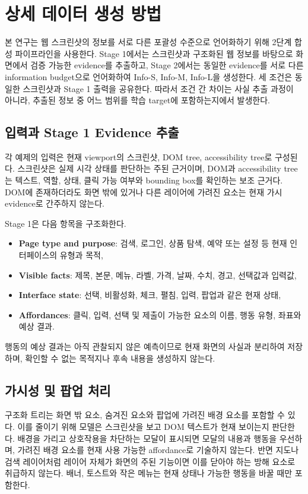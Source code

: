 \section{상세 데이터 생성 방법}
\label{app:data_generation}

본 연구는 웹 스크린샷의 정보를 서로 다른 포괄성 수준으로 언어화하기
위해 2단계 합성 파이프라인을 사용한다. Stage 1에서는 스크린샷과
구조화된 웹 정보를 바탕으로 화면에서 검증 가능한 evidence를 추출하고,
Stage 2에서는 동일한 evidence를 서로 다른 information budget으로
언어화하여 Info-S, Info-M, Info-L을 생성한다. 세 조건은 동일한
스크린샷과 Stage 1 출력을 공유한다. 따라서 조건 간 차이는 사실 추출
과정이 아니라, 추출된 정보 중 어느 범위를 학습 target에 포함하는지에서
발생한다.

\subsection{입력과 Stage 1 Evidence 추출}

각 예제의 입력은 현재 viewport의 스크린샷, DOM tree, accessibility
tree로 구성된다. 스크린샷은 실제 시각 상태를 판단하는 주된 근거이며,
DOM과 accessibility tree는 텍스트, 역할, 상태, 클릭 가능 여부와
bounding box를 확인하는 보조 근거다. DOM에 존재하더라도 화면 밖에
있거나 다른 레이어에 가려진 요소는 현재 가시 evidence로 간주하지
않는다.

Stage 1은 다음 항목을 구조화한다.
\begin{itemize}
    \item \textbf{Page type and purpose}: 검색, 로그인, 상품 탐색,
          예약 또는 설정 등 현재 인터페이스의 유형과 목적,
    \item \textbf{Visible facts}: 제목, 본문, 메뉴, 라벨, 가격, 날짜,
          수치, 경고, 선택값과 입력값,
    \item \textbf{Interface state}: 선택, 비활성화, 체크, 펼침, 입력,
          팝업과 같은 현재 상태,
    \item \textbf{Affordances}: 클릭, 입력, 선택 및 제출이 가능한
          요소의 이름, 행동 유형, 좌표와 예상 결과.
\end{itemize}
행동의 예상 결과는 아직 관찰되지 않은 예측이므로 현재 화면의 사실과
분리하여 저장하며, 확인할 수 없는 목적지나 후속 내용을 생성하지 않는다.

\subsection{가시성 및 팝업 처리}

구조화 트리는 화면 밖 요소, 숨겨진 요소와 팝업에 가려진 배경 요소를
포함할 수 있다. 이를 줄이기 위해 모델은 스크린샷을 보고 DOM 텍스트가
현재 보이는지 판단한다. 배경을 가리고 상호작용을 차단하는 모달이
표시되면 모달의 내용과 행동을 우선하며, 가려진 배경 요소를 현재 사용
가능한 affordance로 기술하지 않는다. 반면 지도나 검색 레이어처럼
레이어 자체가 화면의 주된 기능이면 이를 닫아야 하는 방해 요소로
취급하지 않는다. 배너, 토스트와 작은 메뉴는 현재 상태나 가능한 행동을
바꿀 때만 포함한다.

